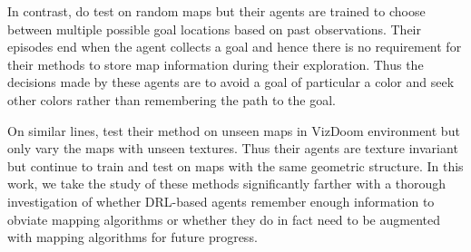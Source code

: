 In contrast, \cite{OhChSiICML2016} do test on random maps but their agents are trained to choose between multiple possible goal locations based on past observations. Their episodes end when the agent collects a goal and hence there is no requirement for their methods to store map information during their exploration. Thus the decisions made by these agents are to avoid a goal of particular a color and seek other colors rather than remembering the path to the goal. 

On similar lines, \cite{ChLaSaNIPS2016} test their method on unseen maps in VizDoom environment but only vary the maps with unseen textures. Thus their agents are texture invariant but continue to train and test on maps with the same geometric structure.
%
In this work, we take the study of these methods significantly farther with a thorough investigation of whether DRL-based agents remember enough information to obviate mapping algorithms or whether they do in fact need to be augmented with mapping algorithms for future progress.

